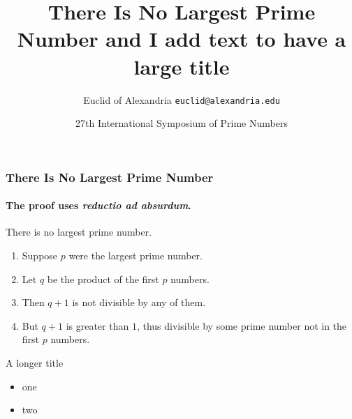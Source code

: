 \documentclass{beamer}
\title{There Is No Largest Prime Number and I add text to have a large title}
\date[ISPN ’80]{27th International Symposium of Prime Numbers}
\author[Euclid]{Euclid of Alexandria \texttt{euclid@alexandria.edu}}
\begin{document}
	
	\begin{frame}
	\titlepage
	\end{frame}

	\begin{frame} 
	\frametitle{There Is No Largest Prime Number} 
	\framesubtitle{The proof uses \textit{reductio ad absurdum}.} 
	\begin{theorem}
		There is no largest prime number. \end{theorem} 
		\begin{enumerate} 
			\item<1-| alert@1> Suppose $p$ were the largest prime number. 
			\item<2-> Let $q$ be the product of the first $p$ numbers. 
			\item<3-> Then $q+1$ is not divisible by any of them. 
			\item<1-> But $q + 1$ is greater than $1$, thus divisible by some prime
			number not in the first $p$ numbers.
		\end{enumerate}
	\end{frame}

	\begin{frame}{A longer title}
		\begin{itemize}
			\item one
			\item two
		\end{itemize}
	\end{frame}
\end{document}
